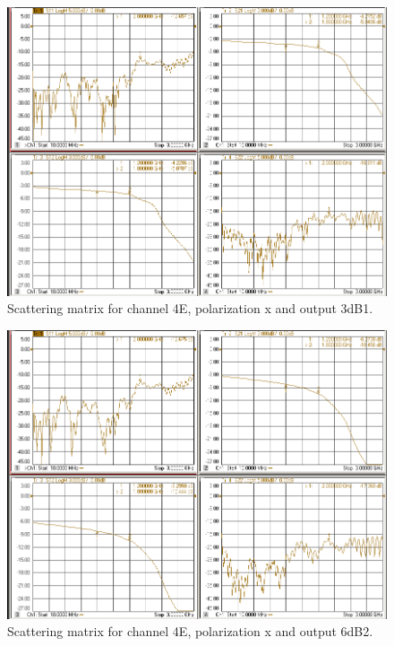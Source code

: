 \documentclass[12pt,a4paper,oneside]{article}
\begin{document}
\begin{figure}[H]
\centering
\includegraphics[width=0.9\linewidth]{VNA_results/4Ex_3dB1.png}
\caption{Scattering matrix for channel 4E, polarization x and output 3dB1.}
\label{fig:4Ex_3dB1}
\end{figure}


\begin{figure}[H]
\centering
\includegraphics[width=0.9\linewidth]{VNA_results/4Ex_6dB2.png}
\caption{Scattering matrix for channel 4E, polarization x and output 6dB2.}
\label{fig:4Ex_6dB2}
\end{figure}
\end{document}
